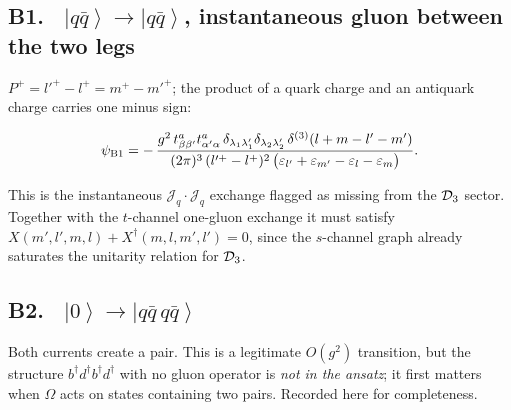 \documentclass[11pt]{article}
\newcommand{\ibar}[2]{\draw[line width=1.1pt] (#1-0.13,#2) -- (#1+0.13,#2);}
\newcommand{\dg}{\dagger}
\newcommand{\eps}{\varepsilon}
\newcommand{\dthree}{\delta^{(3)}}
\newcommand{\ket}[1]{\left|#1\right\rangle}
\newcommand{\vac}{\ket{0}}
\newcommand{\qk}[3]{q^{#1}_{#2}(#3)}
\newcommand{\aqk}[3]{\bar q^{#1}_{#2}(#3)}
\newcommand{\Jc}{\mathcal{J}}
\begin{document}
\subsection*{B1. \ $\ket{q\bar q}\to\ket{q\bar q}$, instantaneous gluon between the two legs}
\begin{center}
\end{center}
$P^{+}=l'^{+}-l^{+}=m^{+}-m'^{+}$; the product of a quark charge and an antiquark charge carries
one minus sign:
\begin{res}
\begin{equation}
\psi_{\rm B1}=-\,\frac{g^{2}\,t^{a}_{\beta\beta'}t^{a}_{\alpha'\alpha}\,
\delta_{\lambda_{1}\lambda_{1}'}\delta_{\lambda_{2}\lambda_{2}'}\,\dthree(l+m-l'-m')}
{(2\pi)^{3}\,(l'^{+}-l^{+})^{2}\,
\big(\eps_{l'}+\eps_{m'}-\eps_{l}-\eps_{m}\big)} .
\label{eq:B1}
\end{equation}
\end{res}
\noindent
This is the instantaneous $\Jc_{q}\!\cdot\!\Jc_{q}$ exchange flagged as missing from the $\mathcal{D}_{3}$
sector. Together with the $t$-channel one-gluon exchange it must satisfy
$X(m',l',m,l)+X^{\dg}(m,l,m',l')=0$, since the $s$-channel graph already saturates the unitarity
relation for $\mathcal{D}_{3}$.

\subsection*{B2. \ $\vac\to\ket{q\bar q\,q\bar q}$}
\begin{center}
\end{center}
Both currents create a pair. This is a legitimate $O(g^{2})$ transition, but the structure
$b^{\dg}d^{\dg}b^{\dg}d^{\dg}$ with no gluon operator is \emph{not in the ansatz}; it first
matters when $\Omega$ acts on states containing two pairs. Recorded here for completeness.
\end{document}
